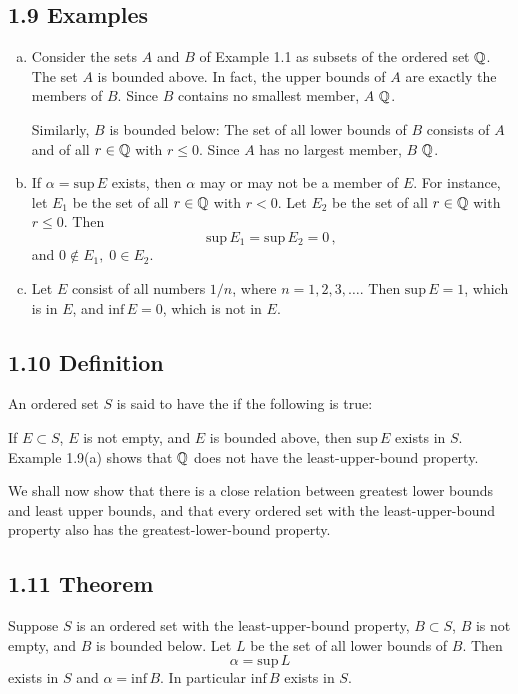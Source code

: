 \subsection*{1.9 Examples}
\begin{enumerate}[(a)]
\item Consider the sets $A$ and $B$ of Example 1.1 as subsets of the ordered set $\mathbb{Q}$. The set $A$ is bounded above. In fact, the upper bounds of $A$ are exactly the members of $B$. Since $B$ contains no smallest member, $A$  $\mathbb{Q}$.

Similarly, $B$ is bounded below: The set of all lower bounds of $B$ consists of $A$ and of all $r \in \mathbb{Q}$ with $r \leq 0$. Since $A$ has no largest member, $B$  $\mathbb{Q}$.
   
\item If $\alpha = \text{sup}\,E$ exists, then $\alpha$ may or may not be a member of $E$. For instance, let $E_1$ be the set of all 
$r \in \mathbb{Q}$ with $r < 0$. Let $E_2$ be the set of all $r \in \mathbb{Q}$ with $r \leq 0$. Then 
$$\text{sup}\,E_1 = \text{sup}\,E_2 = 0\,,$$ 
and $0 \notin E_1,\; 0 \in E_2.$

\item Let $E$ consist of all numbers $1/n$, where $n = 1, 2, 3, \ldots$. Then $\text{sup}\,E = 1$, which is in $E$, 
and $\text{inf}\,E = 0$, which is not in $E$.  
\end{enumerate}

\subsection*{1.10 Definition}
An ordered set $S$ is said to have the  if the following is true:
\begin{list}{}{\leftmargin=\parindent\rightmargin=0pt}
\item If $E \subset S$, $E$ is not empty, and $E$ is bounded above, then $\text{sup}\,E$ exists in $S$.\\
Example 1.9(a) shows that $\mathbb{Q}$ does not have the least-upper-bound property. 
\end{list}
We shall now show that there is a close relation between greatest lower bounds and least upper bounds, and that every ordered set with the least-upper-bound property also has the greatest-lower-bound property.   

\subsection*{1.11 Theorem}
Suppose $S$ is an ordered set with the least-upper-bound property, $B \subset S$, $B$ is not empty, and $B$ is bounded below. Let $L$ be the set of all lower bounds of $B$. Then $$\alpha = \text{sup}\,L$$ exists in $S$ and $\alpha = \text{inf}\,B$. In particular $\text{inf}\,B$ exists in $S$.

